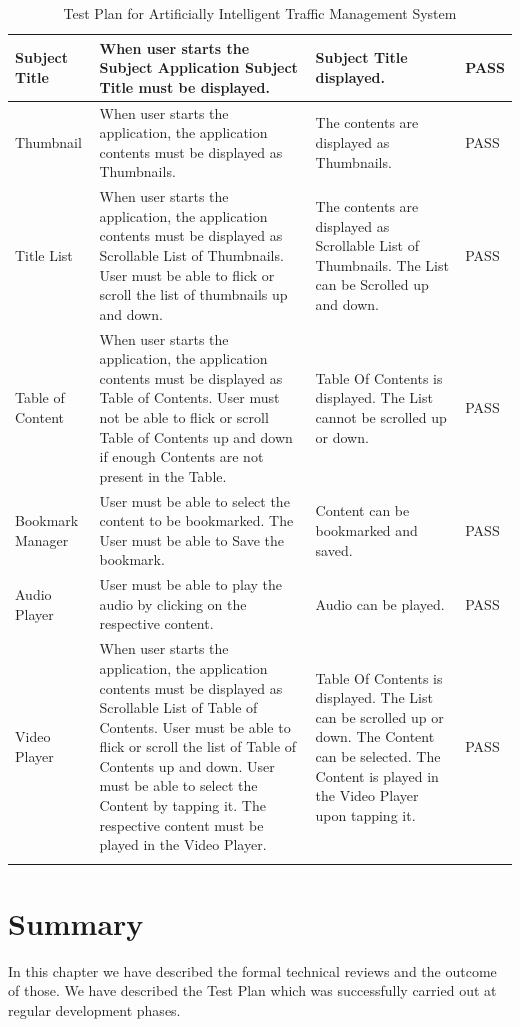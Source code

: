 \documentclass[openany,12pt]{report}
\begin{document}
\begin{longtable}{|p{3.5cm}|p{5cm}|p{3.5cm}|p{1.7cm}|}
Subject Title &When user  starts the Subject Application Subject Title must be displayed. &Subject Title  displayed. &PASS \\\hline
Thumbnail &When user starts the application, the application contents must be displayed as Thumbnails. &The  contents are displayed  as Thumbnails. &PASS \\\hline
Title List &When user starts the application, the application contents must be displayed as Scrollable List of Thumbnails. User must be able to flick or scroll the list of thumbnails up and down. &The contents are displayed as Scrollable List of  Thumbnails. The List can be Scrolled up and down. &PASS \\\hline
Table of Content &When user starts the application, the application contents must be displayed as Table of Contents. User must not be able to flick or scroll Table of Contents up and down if enough Contents are not present in the Table. &Table Of Contents is  displayed. The List cannot be scrolled up or down. &PASS \\\hline
Bookmark Manager &User must be able to select the content to be bookmarked. The User must be able to Save the bookmark. &Content can be bookmarked and saved. &PASS \\\hline
Audio Player &User must be able to play the audio by clicking on the respective content. &Audio can be played. &PASS \\\hline
Video Player &When user starts the application, the application contents must be displayed as Scrollable List of Table of Contents. User must be able to flick or scroll the list of Table of Contents up and down. User must be able to select the Content by tapping it. The respective content must be played in the Video Player. &Table Of Contents is  displayed. The List can be scrolled up or down. The Content can be selected. The Content is played in the Video Player upon tapping it. &PASS \\\hline
\caption{Test Plan for Artificially Intelligent Traffic Management System}
\label{tab:nnwork}
\end{longtable}

\section{Summary}
\hspace{0.5in}In this chapter we have described the formal technical reviews and the outcome of those. We have described the Test Plan which was successfully carried out at regular development phases.\\
\end{document}
